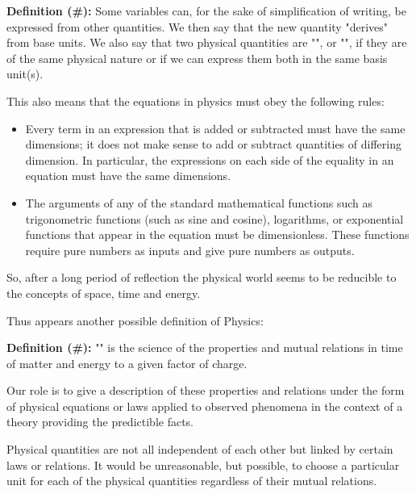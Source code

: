 	\textbf{Definition (\#\mydef):} Some variables can, for the sake of simplification of writing, be expressed from other quantities. We then say that the new quantity "derives" from base units. We also say that two physical quantities are "", or "", if they are of the same physical nature or if we can express them both in the same basis unit(s).
	
	This also means that the equations in physics must obey the following rules:	
	\begin{itemize}
		\item Every term in an expression that is added or subtracted must have the same dimensions; it does not make sense to add or subtract quantities of differing dimension. In particular, the expressions on each side of the equality in an equation must have the same dimensions.

		\item The arguments of any of the standard mathematical functions such as trigonometric functions (such as sine and
cosine), logarithms, or exponential functions that appear in the equation must be dimensionless. These functions require pure numbers as inputs and give pure numbers as outputs.
	\end{itemize}
	
	So, after a long period of reflection the physical world seems to be reducible to the concepts of space, time and energy.
	
	Thus appears another possible definition of Physics:
	
	\textbf{Definition (\#\mydef):} "" is the science of the properties and mutual relations in time of matter and energy to a given factor of charge.
	
	Our role is to give a description of these properties and relations under the form of physical equations or laws applied to observed phenomena in the context of a theory providing the predictible facts.
	
	Physical quantities are not all independent of each other but linked by certain laws or relations. It would be unreasonable, but possible, to choose a particular unit for each of the physical quantities regardless of their mutual relations.
	
